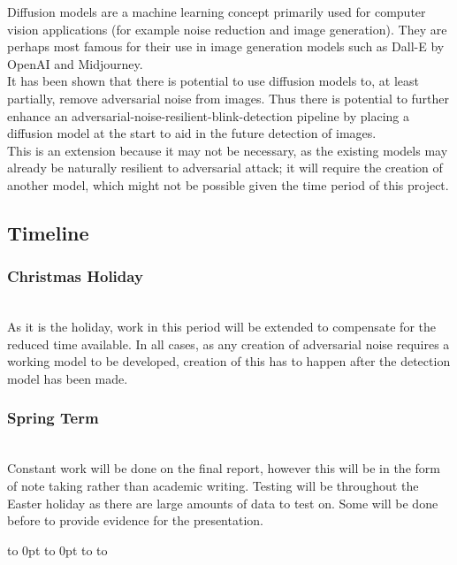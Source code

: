 \documentclass{article}
\begin{document}
Diffusion models are a machine learning concept primarily used for computer vision applications (for example noise reduction and image generation)\cite{croitoru2023diffusion}. They are perhaps most famous for their use in image generation models such as Dall-E by OpenAI and Midjourney.\\

It has been shown that there is potential to use diffusion models to, at least partially, remove adversarial noise from images\cite{nie2022diffusion}\cite{croitoru2023diffusion}. Thus there is potential to further enhance an adversarial-noise-resilient-blink-detection pipeline by placing a diffusion model at the start to aid in the future detection of images.\\

This is an extension because it may not be necessary, as the existing models may already be naturally resilient to adversarial attack; it will require the creation of another model, which might not be possible given the time period of this project.

\newpage
\thispagestyle{empty}
\def\fillandplacepagenumber{
 \par\pagestyle{empty}
 \vbox to 0pt{\vss}\vfill
 \vbox to 0pt{\baselineskip0pt
   \hbox to\linewidth{\hss}
   \baselineskip\footskip
   \hbox to\linewidth{
     \hfil\thepage\hfil}\vss}}
\begin{landscape}
\subsection{Timeline} \label{sec:timeline}
\subsubsection{Christmas Holiday}
\\
\noindent As it is the holiday, work in this period will be extended to compensate for the reduced time available. In all cases, as any creation of adversarial noise requires a working model to be developed, creation of this has to happen after the detection model has been made.
\subsubsection{Spring Term}
\resizebox{1.5\textwidth}{!}{}\\
Constant work will be done on the final report, however this will be in the form of note taking rather than academic writing. Testing will be throughout the Easter holiday as there are large amounts of data to test on. Some will be done before to provide evidence for the presentation.
\fillandplacepagenumber
\end{landscape}
\end{document}
